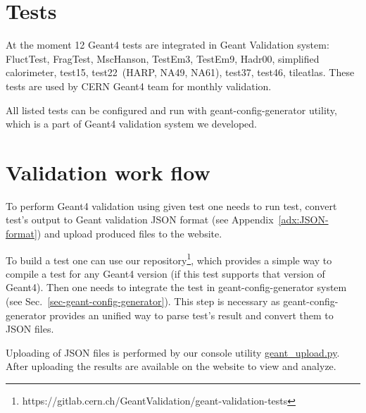 \section{Tests}
\label{sec-tests}


At the moment 12 Geant4 tests are integrated in Geant Validation system: FluctTest, FragTest, MscHanson, TestEm3, TestEm9, Hadr00, simplified calorimeter, test15, test22~(HARP, NA49, NA61), test37, test46, tileatlas. These tests are used by CERN Geant4 team for monthly validation.

All listed tests can be configured and run with geant-config-generator utility, which is a part of Geant4 validation system we developed.

\section{Validation work flow}
\label{sec-workflow}

To perform Geant4 validation using given test one needs to run test, convert test's output to Geant validation JSON format (see Appendix~\ref{adx:JSON-format}) and upload produced files to the website.

To build a test one can use our  repository\footnote{https://gitlab.cern.ch/GeantValidation/geant-validation-tests}, which provides a simple way to compile a test for any Geant4 version (if this test supports that version of Geant4).
Then one needs to integrate the test in geant-config-generator system (see Sec.~\ref{sec-geant-config-generator}). This step is necessary as geant-config-generator provides an unified way to parse test's result and convert them to JSON files. 

Uploading of JSON files is performed by our console utility
\href{https://gitlab.cern.ch/GeantValidation/GVP/raw/master/scripts/geant_upload.py}{geant\_upload.py}.
After uploading the results are available on the website to view and analyze.




